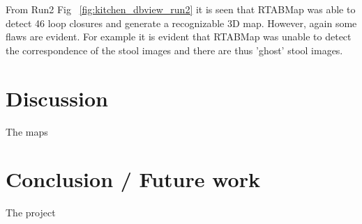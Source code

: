 \documentclass[10pt,journal,compsoc]{IEEEtran}
\begin{document}
From Run2 Fig ~\ref{fig:kitchen_dbview_run2} it is seen that RTABMap was able to detect 46 loop closures and generate a recognizable 3D map. However, again some flaws are evident. For example it is evident that RTABMap was unable to detect the correspondence of the stool images and there are thus 'ghost' stool images.

\section{Discussion}
The maps

\section{Conclusion / Future work}
The project 
\end{document}

